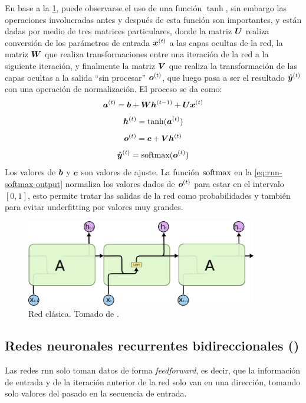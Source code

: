 En base a la \cref{fig:rnn-classic}, puede observarse el uso de una función $\tanh$, sin embargo las operaciones involucradas antes y después de esta función son importantes, y están dadas por medio de tres matrices particulares, donde la matriz ${\bm{U}}$ realiza conversión de los parámetros de entrada ${\bm{x}}^{(t)}$ a las capas ocultas de la red, la matriz ${\bm{W}}$ que realiza transformaciones entre una iteración de la red a la siguiente iteración, y finalmente la matriz ${\bm{V}}$ que realiza la transformación de las capas ocultas a la salida ``sin procesar'' ${\bm{o}}^{(t)}$, que luego pasa a ser el resultado $\hat{{\bm{y}}}^{(t)}$ con una operación de normalización. El proceso se da como:
\begin{equation}
  {\bm{a}}^{(t)} = {\bm{b}} + {\bm{W}} {\bm{h}}^{(t-1)} + {\bm{U}} {\bm{x}}^{(t)}
\end{equation}
\begin{equation}
  {\bm{h}}^{(t)} = \tanh({\bm{a}}^{(t)})
\end{equation}
\begin{equation}
  {\bm{o}}^{(t)} = {\bm{c}} + {\bm{V}} {\bm{h}}^{(t)}
\end{equation}
\begin{equation} \label{eq:rnn-softmax-output}
  \hat{{\bm{y}}}^{(t)} = \mathrm{softmax}({\bm{o}}^{(t)})
\end{equation}
Los valores de ${\bm{b}}$ y ${\bm{c}}$ son valores de ajuste. La función $\mathrm{softmax}$ en la \cref{eq:rnn-softmax-output} normaliza los valores dados de ${\bm{o}}^{(t)}$ para estar en el intervalo $[0, 1]$, esto permite tratar las salidas de la red como probabilidades y también para evitar \gls{underfitting} por valores muy grandes.

\begin{figure}[H]
  \centering
  \includegraphics[width=0.9\textwidth]{Figures/LSTM3-SimpleRNN.png}
\decoRule
\caption[Red  clásica]{Red  clásica. Tomado de \cite{understanding-lstm}.}
\label{fig:rnn-classic}
\end{figure}

\subsection{Redes neuronales recurrentes bidireccionales ()}
Las redes \gls{rnn} solo toman datos de forma \textsl{feedforward}, es decir, que la información de entrada y de la iteración anterior de la red solo van en una dirección, tomando solo valores del pasado en la secuencia de entrada.

